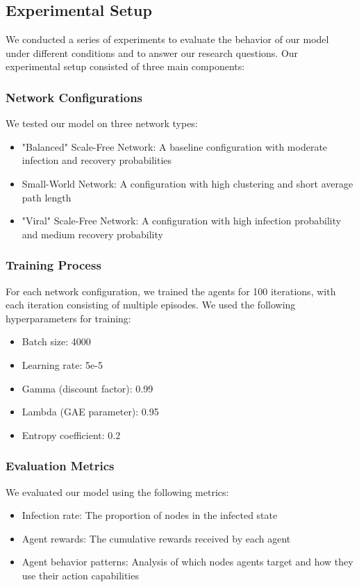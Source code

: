 \documentclass[12pt]{article}
\begin{document}
\subsection{Experimental Setup}

We conducted a series of experiments to evaluate the behavior of our model under different conditions and to answer our research questions. Our experimental setup consisted of three main components:

\subsubsection{Network Configurations}

We tested our model on three network types:
\begin{itemize}
    \item "Balanced" Scale-Free Network: A baseline configuration with moderate infection and recovery probabilities
    \item Small-World Network: A configuration with high clustering and short average path length
    \item "Viral" Scale-Free Network: A configuration with high infection probability and medium recovery probability
\end{itemize}

\subsubsection{Training Process}

For each network configuration, we trained the agents for 100 iterations, with each iteration consisting of multiple episodes. We used the following hyperparameters for training:
\begin{itemize}
    \item Batch size: 4000
    \item Learning rate: 5e-5
    \item Gamma (discount factor): 0.99
    \item Lambda (GAE parameter): 0.95
    \item Entropy coefficient: 0.2
\end{itemize}

\subsubsection{Evaluation Metrics}

We evaluated our model using the following metrics:
\begin{itemize}
    \item Infection rate: The proportion of nodes in the infected state
    \item Agent rewards: The cumulative rewards received by each agent
    \item Agent behavior patterns: Analysis of which nodes agents target and how they use their action capabilities
\end{itemize}
\end{document}

